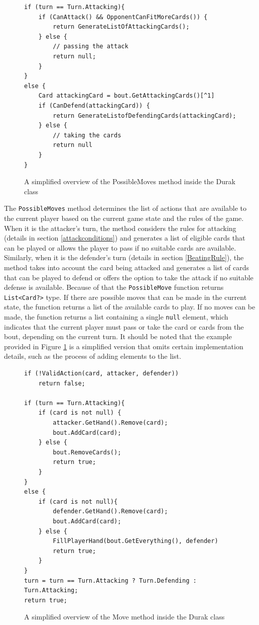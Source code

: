 \begin{figure}[h]
\captionsetup{justification=centering}
\begin{lstlisting}
if (turn == Turn.Attacking){
    if (CanAttack() && OpponentCanFitMoreCards()) {
        return GenerateListOfAttackingCards();
    } else {
        // passing the attack
        return null;	
    }
}
else {
    Card attackingCard = bout.GetAttackingCards()[^1]
    if (CanDefend(attackingCard)) {
        return GenerateListofDefendingCards(attackingCard);
    } else {
        // taking the cards
        return null
    }
}
\end{lstlisting}
\caption{A simplified overview of the PossibleMoves method inside the Durak class}
\label{fig:codePossibleMoves}
\end{figure}

The \texttt{PossibleMoves} method determines the list of actions that are available to the current player based on the current game state and the rules of the game. When it is the attacker's turn, the method considers the rules for attacking (details in section \ref{attackconditions}) and generates a list of eligible cards that can be played or allows the player to pass if no suitable cards are available. Similarly, when it is the defender's turn (details in section \ref{BeatingRule}), the method takes into account the card being attacked and generates a list of cards that can be played to defend or offers the option to take the attack if no suitable defense is available. Because of that the \texttt{PossibleMove} function returns \texttt{List<Card?>} type. If there are possible moves that can be made in the current state, the function returns a list of the available cards to play. If no moves can be made, the function returns a list containing a single \texttt{null} element, which indicates that the current player must pass or take the card or cards from the bout, depending on the current turn. It should be noted that the example provided in Figure \ref{fig:codePossibleMoves} is a simplified version that omits certain implementation details, such as the process of adding elements to the list. 

\begin{figure}[h]
\captionsetup{justification=centering}
\begin{lstlisting}
if (!ValidAction(card, attacker, defender)) 
    return false;
	
if (turn == Turn.Attacking){
    if (card is not null) {
        attacker.GetHand().Remove(card);
        bout.AddCard(card);
    } else {
        bout.RemoveCards();
        return true;
    }
}
else {
    if (card is not null){
        defender.GetHand().Remove(card);
        bout.AddCard(card);
    } else {
        FillPlayerHand(bout.GetEverything(), defender)
        return true;
    }	
}
turn = turn == Turn.Attacking ? Turn.Defending : Turn.Attacking;
return true;
\end{lstlisting}
\caption{A simplified overview of the Move method inside the Durak class}
\label{fig:codeMove}
\end{figure}

